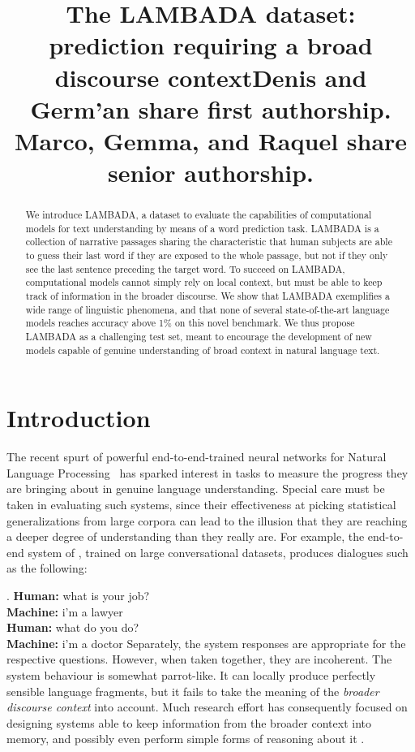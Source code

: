 \title{The LAMBADA dataset: prediction requiring a broad discourse contextDenis and Germ'an share first authorship. Marco, Gemma, and Raquel share senior authorship.}

\begin{abstract}
We introduce LAMBADA, a dataset to evaluate the capabilities of computational models for text understanding by means of a word prediction task. LAMBADA is a collection of narrative passages sharing the characteristic that human subjects are able to guess their last word if they are exposed to the whole passage, but not if they only see the last sentence preceding the target word. To succeed on LAMBADA, computational models cannot simply rely on local context, but must be able to keep track of information in the broader discourse. We show that LAMBADA exemplifies a wide range of linguistic phenomena, and that none of several state-of-the-art language models reaches accuracy above 1\% on this novel benchmark. We thus propose LAMBADA as a challenging test set, meant to encourage the development of new models capable of genuine understanding of broad context in natural language text.
\end{abstract}

\section{Introduction}
\label{sec:intro}

The recent spurt of powerful end-to-end-trained neural networks for Natural Language Processing
\cite[a.o.]{Hermann:etal:2015,Rocktaeschel:etal:2016,Weston:etal:2015b}~has
sparked interest in tasks to measure the progress they are bringing about in genuine language understanding. Special care must be taken in evaluating such systems, since their effectiveness at picking statistical generalizations from large corpora can lead to the illusion that they are reaching a deeper degree of understanding than they really are. For example, the end-to-end system of
, trained on large conversational datasets, produces dialogues such as the following:

\ex.
{}\textbf{Human:} what is your job?\\
{}\textbf{Machine:} i'm a lawyer\\
{}\textbf{Human:} what do you do?\\
{}\textbf{Machine:} i'm a doctor Separately, the system responses are appropriate for the respective questions. However, when taken together, they are incoherent. The system behaviour is somewhat parrot-like. It can locally produce perfectly sensible language fragments, but it fails to take the meaning of the \emph{broader discourse context} into account. Much research effort has consequently focused on designing systems able to keep information from the broader context into memory, and possibly even perform simple forms of reasoning about it
\cite[a.o.]{Hermann:etal:2015,Hochreiter:Schmidhuber:1997,Ji:etal:2015,Mikolov:etal:2015,Sordoni:etal:2015,Sukhbaatar:etal:2015,Wang:Cho:2015}.

